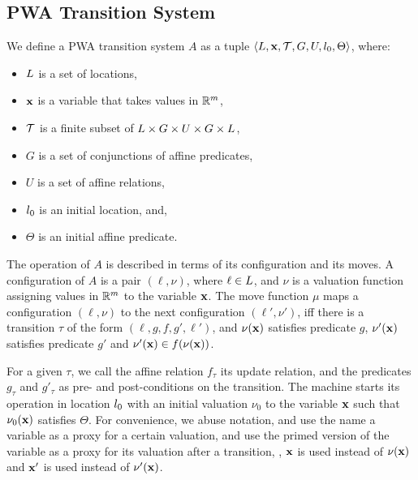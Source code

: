 \subsection{PWA Transition System}

We define a PWA transition system $A$ as a tuple
$\left\langle L,\mathbf{x},\mathcal{T}, G, U, l_0,\Theta \right \rangle$, where:
\begin{itemize}[noitemsep, leftmargin= 1.5 em]
\item
$L$ is a set of locations,
\item
$\mathbf{x}$ is a variable that takes values in $\mathbb{R}^m$,
\item
$\mathcal{T}$ is a finite subset of $L \times G \times U \times G \times L$, 
\item
$G$ is a set of conjunctions of affine predicates, 
\item
$U$ is a set of affine relations,
\item
$l_0$ is an initial location, and,
\item
$\Theta$ is an initial affine predicate.
\end{itemize}

The operation of $A$ is described in terms of its configuration and
its moves. A configuration of $A$ is a pair $(\ell, \nu)$, where $\ell
\in L$, and $\nu$ is a valuation function assigning values in
$\mathbb{R}^m$ to the variable $\mathbf{x}$.  The move function $\mu$ maps a
configuration $(\ell,\nu)$ to the next configuration $(\ell',\nu')$,
iff there is a transition $\tau$ of the form $(\ell,g,f,g',\ell')$,
and $\nu(\mathbf{x})$ satisfies predicate $g$, $\nu'(\mathbf{x})$ satisfies
predicate $g'$ and $\nu'(\mathbf{x}) \in f(\nu(\mathbf{x}))$.

For a given $\tau$, we call the affine relation $f_\tau$ its update
relation, and the predicates $g_\tau$ and $g'_\tau$ as pre- and
post-conditions on the transition. The machine starts its operation in
location $l_0$ with an initial valuation $\nu_0$ to the variable
$\mathbf{x}$ such that $\nu_0(\mathbf{x})$ satisfies $\Theta$. For convenience, we
abuse notation, and use the name a variable as a proxy for a certain
valuation, and use the primed version of the variable as a proxy for
its valuation after a transition, \ie, $\mathbf{x}$ is used instead of
$\nu(\mathbf{x})$ and $\mathbf{x}'$ is used instead of $\nu'(\mathbf{x})$.

